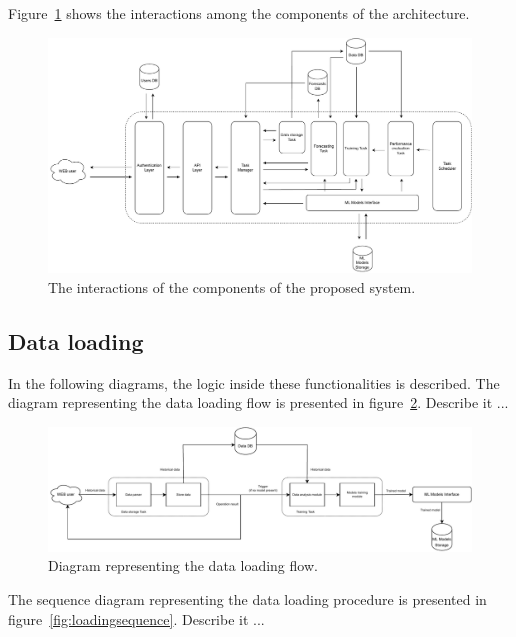 Figure~\ref{fig:interactions} shows the interactions among the components of the architecture.

\begin{figure}[H]
\centering 
\includegraphics[width=1\textwidth]{images/architecture_interactions}
\caption{The interactions of the components of the proposed system.}
\label{fig:interactions}
\end{figure}


\vspace{0.1 cm}
\subsection{Data loading}
\label{sec:loading}
\vspace{0.1 cm}

In the following diagrams, the logic inside these functionalities is described.
The diagram representing the data loading flow is presented in figure~\ref{fig:loadingflow}.
Describe it ...

\begin{figure}[H]
\centering 
\includegraphics[width=1\textwidth]{images/architecture_data_loading_flow}
\caption{Diagram representing the data loading flow.}
\label{fig:loadingflow}
\end{figure}

The sequence diagram representing the data loading procedure is presented in figure~\ref{fig:loadingsequence}.
Describe it ...

